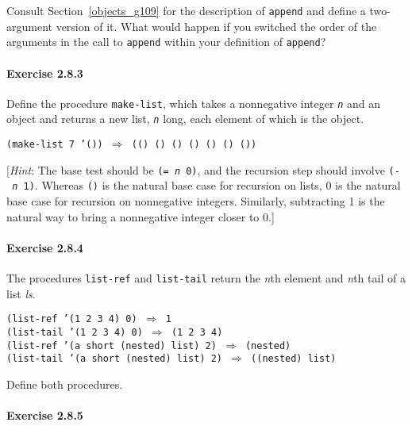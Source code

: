\label{start_s150}Consult Section \ref{objects_g109} for the description of
\label{start_s151}\texttt{append} and
define a two-argument version of it.
What would happen if you switched the order of the arguments in the
call to \texttt{append} within your definition of \texttt{append}?




\paragraph{Exercise \label{start_g35}2.8.3}


\label{start_s152}Define the procedure \label{start_s153}\texttt{make-list}, which
takes a nonnegative integer
\texttt{\textit{n}} and an object and returns a new list, \texttt{\textit{n}} long, each
element of which is the object.


\texttt{(make-list 7 '()) \(\Rightarrow\) (() () () () () () ())}

[\textit{Hint}: The base test should be \texttt{(= \textit{n} 0)}, and the recursion
step should involve \texttt{(- \textit{n} 1)}.
Whereas \texttt{()} is the natural base case for recursion on lists, 0
is the natural base case for recursion on nonnegative integers.
Similarly, subtracting 1 is the natural way to bring a nonnegative
integer closer to 0.]




\paragraph{Exercise \label{start_g36}2.8.4}


\label{start_s154}The procedures \texttt{list-ref} and \texttt{list-tail} return the
\textit{n}th element and \textit{n}th tail of a list \textit{ls}.


\begin{alltt}
(list-ref '(1 2 3 4) 0) \(\Rightarrow\) 1
(list-tail '(1 2 3 4) 0) \(\Rightarrow\) (1 2 3 4)
(list-ref '(a short (nested) list) 2) \(\Rightarrow\) (nested)
(list-tail '(a short (nested) list) 2) \(\Rightarrow\) ((nested) list)
\end{alltt}


Define both procedures.




\paragraph{Exercise \label{start_g37}2.8.5}


